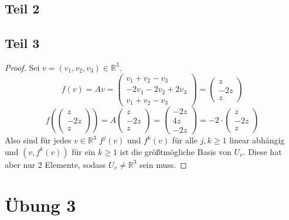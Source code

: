 \documentclass[10pt,a4paper]{article}
\begin{document}
\subsection*{Teil 2}

\subsection*{Teil 3}

\begin{proof}
Sei $v = (v_{1}, v_{2}, v_{3}) \in \mathbb{R}^{3}$.
\begin{equation}
f(v) = Av = \begin{pmatrix}
v_{1} + v_{2} - v_{3}\\
-2v_{1} - 2v_{2} + 2v_{3}\\
v_{1} + v_{2} - v_{3}
\end{pmatrix}
= \begin{pmatrix}
z\\-2z\\z
\end{pmatrix}
\end{equation}
\begin{equation}
f(\begin{pmatrix}
z\\-2z\\z
\end{pmatrix}) = A\begin{pmatrix}
z\\-2z\\z
\end{pmatrix}
= \begin{pmatrix}
-2z\\4z\\-2z
\end{pmatrix}
= -2 \cdot \begin{pmatrix}
z\\-2z\\z
\end{pmatrix}
\end{equation}
Also sind für jedes $v \in \mathbb{R}^{3}$ $f^{j}(v)$ und $f^{k}(v)$ für alle $j, k \ge 1$ linear abhängig und $(v, f^{k}(v))$ für ein $k \ge 1$ ist die größtmögliche Basis von $U_{v}$.
Diese hat aber nur 2 Elemente, sodass $U_{v} \ne \mathbb{R}^{3}$ sein muss.
\end{proof}

\section*{Übung 3}
\end{document}
